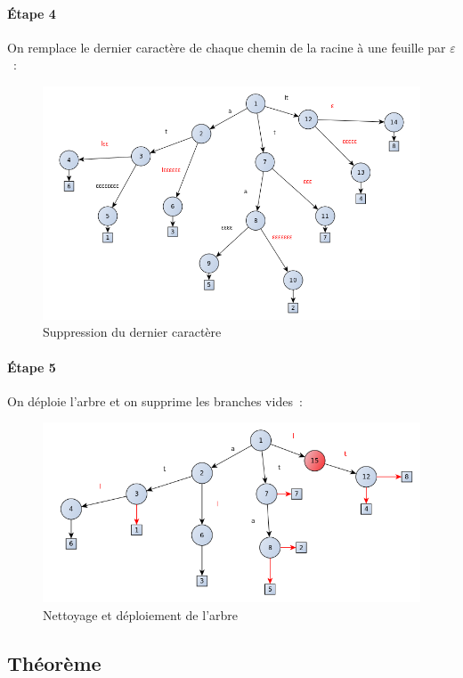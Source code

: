 \documentclass[a4paper]{article}
\begin{document}
\paragraph{Étape 4} On remplace le dernier caractère de chaque chemin
de la racine à une feuille par $\varepsilon$~:

\begin{figure}[H]
\centering
\includegraphics[width=\textwidth]{./slides/img/construction-3.png}
\caption{Suppression du dernier caractère}
\label{overflow}
\end{figure}

\paragraph{Étape 5} On déploie l'arbre et on supprime les branches
vides~:

\begin{figure}[H]
\centering
\includegraphics[width=\textwidth]{./slides/img/construction-45.png}
\caption{Nettoyage et déploiement de l'arbre}
\label{overflow}
\end{figure}

\subsection{Théorème}
\end{document}
